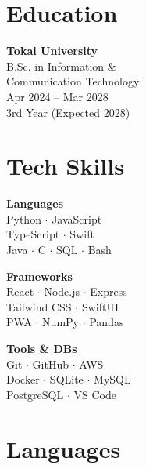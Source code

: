 \documentclass[9.5pt, a4paper]{article}
\begin{document}
\begin{minipage}[t]{0.28\linewidth}
\vspace{0pt}

\section{Education}
{\small\textbf{\color{darkgray}Tokai University}}\\[2pt]
{\footnotesize\color{medgray} B.Sc. in Information \&\\
Communication Technology}\\[2pt]
{\footnotesize\color{medgray} Apr 2024 -- Mar 2028}\\[2pt]
{\footnotesize\color{medgray} 3rd Year (Expected 2028)}

\vspace{4pt}

\section{Tech Skills}

{\footnotesize\textbf{\color{steelblue} Languages}}\\[2pt]
{\footnotesize\color{darkgray} Python $\cdot$ JavaScript\\TypeScript $\cdot$ Swift\\Java $\cdot$ C $\cdot$ SQL $\cdot$ Bash}

\vspace{3pt}
{\footnotesize\textbf{\color{steelblue} Frameworks}}\\[2pt]
{\footnotesize\color{darkgray} React $\cdot$ Node.js $\cdot$ Express\\Tailwind CSS $\cdot$ SwiftUI\\PWA $\cdot$ NumPy $\cdot$ Pandas}

\vspace{3pt}
{\footnotesize\textbf{\color{steelblue} Tools \& DBs}}\\[2pt]
{\footnotesize\color{darkgray} Git $\cdot$ GitHub $\cdot$ AWS\\Docker $\cdot$ SQLite $\cdot$ MySQL\\PostgreSQL $\cdot$ VS Code}

\vspace{4pt}

\section{Languages}


\end{minipage}
\end{document}
